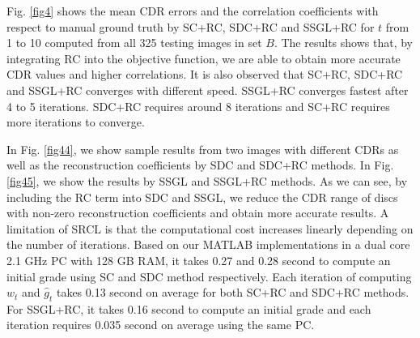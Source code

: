 \documentclass[journal]{IEEEtran}
\begin{document}
\begin{figure*}
	\caption{Samples images with reconstruction coefficients $\textbf{w}$ and resultant CDRs by SSGL and SSGL+RC methods.} \label{fig45}
\end{figure*}

 Fig. \ref{fig4} shows the mean CDR errors and the correlation coefficients with respect to manual ground truth by  SC+RC, SDC+RC and SSGL+RC for $t$ from 1 to 10 computed from all 325 testing images in set $B$. The results shows that, by integrating RC into the objective function, we are able to obtain more accurate CDR values and higher correlations.
 It is also observed that  SC+RC, SDC+RC and SSGL+RC converges with different speed. SSGL+RC converges fastest after 4 to 5 iterations. SDC+RC requires around 8 iterations and SC+RC requires more iterations to converge.

 In Fig. \ref{fig44}, we show   sample results from two images with different CDRs as well as the reconstruction coefficients by SDC and SDC+RC methods. In Fig. \ref{fig45}, we show the results by SSGL and SSGL+RC methods.  As we can see, by including the RC term into SDC and SSGL, we reduce the CDR range of discs with non-zero reconstruction coefficients and obtain more accurate results.    A limitation of SRCL is that the computational cost increases linearly depending on the number of iterations. Based on our MATLAB implementations in a
 dual core 2.1 GHz PC with 128 GB RAM, it takes 0.27 and
 0.28 second to compute an initial grade using SC and SDC
 method respectively. Each iteration of computing $w_t$ and $\hat{g}_t$
 takes 0.13 second on average for both SC+RC and SDC+RC
 methods. For SSGL+RC, it takes 0.16 second to compute
 an initial grade and each iteration requires 0.035 second on
 average using the same PC.
\end{document}
